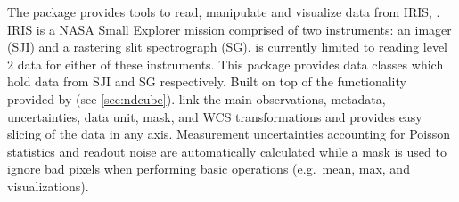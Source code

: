The  package provides tools to read, manipulate and visualize data from IRIS, \citep{DePontieu2014}.
IRIS is a NASA Small Explorer mission comprised of two instruments: an imager (SJI) and a rastering slit spectrograph (SG).
 is currently limited to reading level 2 data for either of these instruments.
This package provides data classes which hold data from SJI and SG respectively.
Built on top of the functionality provided by  (see \autoref{sec:ndcube}).  link the main observations, metadata, uncertainties, data unit, mask, and WCS transformations and provides easy slicing of the data in any axis.
Measurement uncertainties accounting for Poisson statistics and readout noise are automatically calculated while a mask is used to ignore bad pixels when performing basic operations (e.g.\ mean, max, and visualizations).
